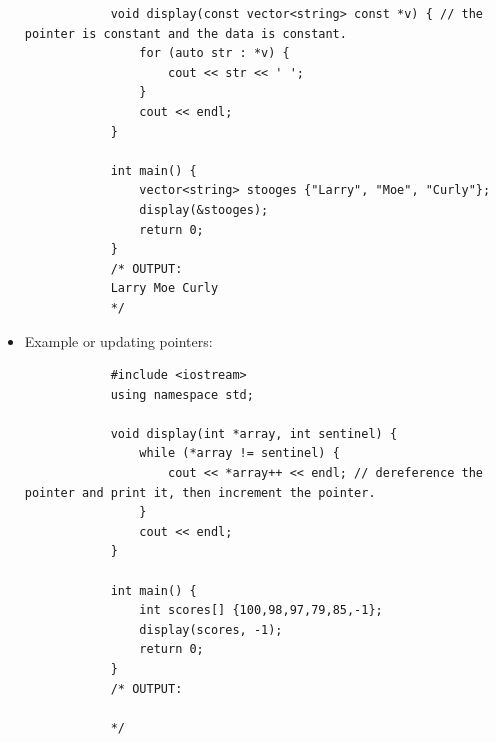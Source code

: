 \begin{itemize}
\begin{verbatim}
            void display(const vector<string> const *v) { // the pointer is constant and the data is constant.
                for (auto str : *v) {
                    cout << str << ' ';
                }
                cout << endl;
            }

            int main() {
                vector<string> stooges {"Larry", "Moe", "Curly"};
                display(&stooges);
                return 0;
            }
            /* OUTPUT:
            Larry Moe Curly
            */
        \end{verbatim}
    
    \item Example or updating pointers:
        \begin{verbatim}
            #include <iostream>
            using namespace std;

            void display(int *array, int sentinel) {
                while (*array != sentinel) { 
                    cout << *array++ << endl; // dereference the pointer and print it, then increment the pointer.
                }
                cout << endl;
            }

            int main() {
                int scores[] {100,98,97,79,85,-1};
                display(scores, -1);
                return 0;
            }
            /* OUTPUT:

            */
        \end{verbatim}
\end{itemize}


